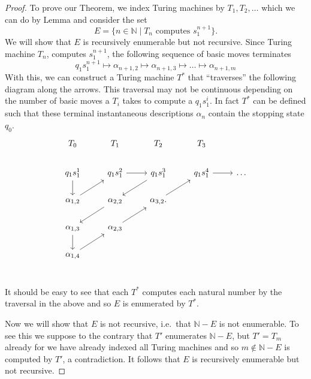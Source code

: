 \begin{proof}
  To prove our Theorem, we index Turing machines by $T_1,T_2, \dots$ which we can do by Lemma and consider the set
  \begin{equation*}
    E = \{ n \in \mathbb{N} \mid T_n \text{ computes }s_1^{n+1} \}.
  \end{equation*}
  We will show that $E$ is recursively enumerable but not recursive. Since Turing machine $T_n$, computes $s_1^{n+1}$, the following sequence of basic moves terminates
  \begin{equation*}
    q_1 s_1^{n+1} \mapsto \alpha_{n+1,2} \mapsto \alpha_{n+1,3} \mapsto \dots \mapsto \alpha_{n+1,m}
  \end{equation*}
  With this, we can construct a Turing machine $T^*$ that ``traverses'' the following diagram along the arrows. This traversal may not be continuous depending on the number of basic moves a $T_i$ takes to compute a  $q_1 s_1^i$. In fact $T^*$ can be defined such that these terminal instantaneous descriptions $\alpha_n$ contain the stopping state $q_0$.
    \begin{equation*}
    \begin{tikzcd}
      T_0 & T_1 & T_2 & T_3 \\
      q_1 s_1^1 \arrow[d] & q_1 s_1^2 \arrow[r] & q_1 s_1^3 \arrow[dl] & q_1 s_1^4\arrow[r] & \dots \\
      \alpha_{1,2} \arrow[ur] & \alpha_{2,2} \arrow[dl]  & \alpha_{3,2} \arrow[ur]. \\
      \alpha_{1,3} \arrow[d]& \alpha_{2,3} \arrow[ur] \\
      \alpha_{1,4} \arrow[ur]\\
    \end{tikzcd}
  \end{equation*}

It should be easy to see that each $T^*$ computes each natural number by the traversal in the above and so $E$ is enumerated by $T^*$.

Now we will show that $E$ is not recursive, i.e.\ that $\mathbb{N} - E$ is not enumerable. To see this we suppose to the contrary that $T'$ enumerates $\mathbb{N} - E$, but $T' = T_m$ already for we have already indexed all Turing machines and so $m \not\in \mathbb{N} - E$ is computed by $T'$, a contradiction. It follows that $E$ is recursively enumerable but not recursive.
\end{proof}

